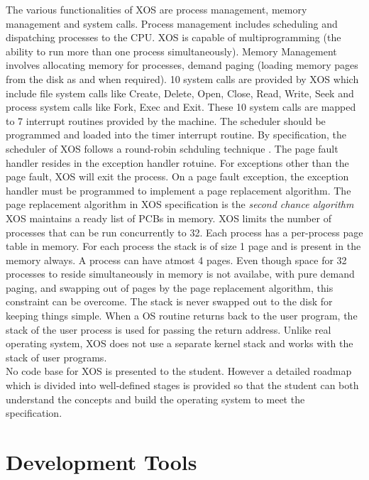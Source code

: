 \documentclass{sig-alternate}
\begin{document}
The various functionalities of XOS are process management, memory management and system calls. Process management includes scheduling and dispatching processes to the CPU. XOS is capable of multiprogramming (the ability to run more than one process simultaneously). Memory Management involves allocating memory for processes, demand paging (loading memory pages from the disk as and when required). 10 system calls are provided by XOS which include file system calls like Create, Delete, Open, Close, Read, Write, Seek and process system calls like Fork, Exec and Exit. These 10 system calls are mapped to 7 interrupt routines provided by the machine. The scheduler should be programmed and loaded into the timer interrupt routine. By specification, the scheduler of XOS follows a round-robin schduling technique \cite{silberschatz}. The page fault handler resides in the exception handler rotuine. For exceptions other than the page fault, XOS will exit the process. On a page fault exception, the exception handler must be programmed to implement a page replacement algorithm. The page replacement algorithm in XOS specification is the \textit{second chance algorithm}\cite{silberschatz} \\

XOS maintains a ready list of PCBs in memory. XOS limits the number of processes that can be run concurrently to 32. Each process has a per-process page table in memory. For each process the stack is of size 1 page and is present in the memory always. A process can have atmost 4 pages. Even though space for 32 processes to reside simultaneously in memory is not availabe, with pure demand paging, and swapping out of pages by the page replacement algorithm, this constraint can be overcome. The stack is never swapped out to the disk for keeping things simple. When a OS routine returns back to the user program,  the stack of the user process is used for passing the return address. Unlike real operating system, XOS does not use a separate kernel stack and works with the stack of user programs. \\

No code base for XOS is presented to the student. However a detailed roadmap which is divided into well-defined stages is provided so that the student can both understand the concepts and build the operating system to meet the specification.




\section{Development Tools}
\end{document}
